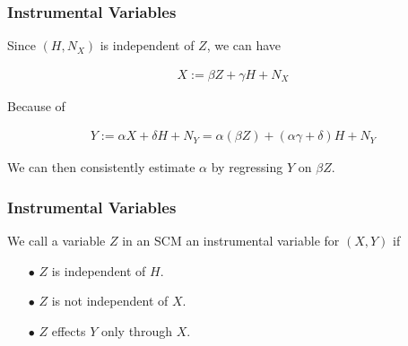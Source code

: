 \documentclass{beamer}
\begin{document}
\begin{frame}
    \frametitle{Instrumental Variables}
    \begin{flushleft}
        Since $(H,N_X)$ is independent of $Z$, we can have
    \end{flushleft}
    \begin{align*}
        X:= \beta Z+\gamma H+N_X
    \end{align*}
    \begin{flushleft}
        Because of
    \end{flushleft}
    \begin{align*}
        Y:= \alpha X + \delta H + N_Y=\alpha(\beta Z) + (\alpha\gamma+\delta)H + N_Y
    \end{align*}
    \begin{flushleft}
        We can then consistently estimate $\alpha$ by regressing $Y$ on $\beta Z$. 
    \end{flushleft}
\end{frame}

\begin{frame}
    \frametitle{Instrumental Variables}
    \begin{flushleft}
        We call a variable $Z$ in an SCM an instrumental variable for $(X,Y)$ if 
    \end{flushleft}
    \begin{itemize}
        \item[$\bullet$] $Z$ is independent of $H$.
        \item[$\bullet$] $Z$ is not independent of $X$.
        \item[$\bullet$] $Z$ effects $Y$ only through $X$.
    \end{itemize}
\end{frame}
\end{document}
